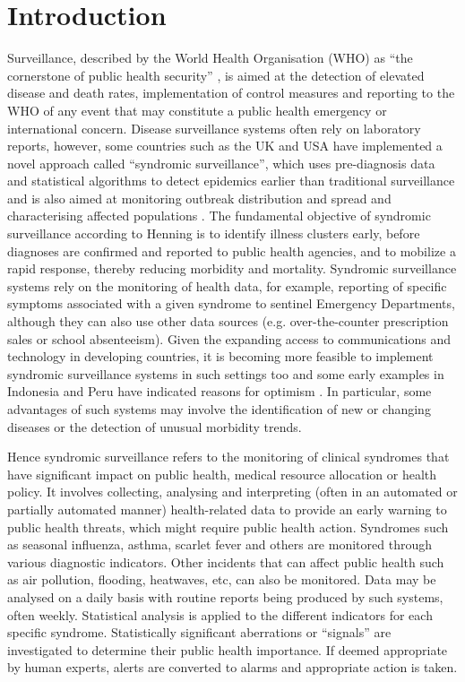 \documentclass[10pt,letterpaper]{article}
\begin{document}
\linenumbers

\section{Introduction}

Surveillance, described by the World Health Organisation (WHO) as ``the cornerstone of public health security'' \cite{REF91}, is aimed at the detection of elevated disease and death rates, implementation of control measures and reporting to the WHO of any event that may constitute a public health emergency or international concern. Disease surveillance systems often rely on laboratory reports, however, some countries such as the UK and USA have implemented a novel approach called ``syndromic surveillance'',  which uses pre-diagnosis data and statistical algorithms to detect epidemics earlier than traditional surveillance and is also aimed at monitoring outbreak distribution and spread and characterising affected populations \cite{REF90}. The fundamental objective of syndromic surveillance according to Henning  \cite{REF93} is to identify illness clusters early, before diagnoses are confirmed and reported to public health agencies, and to mobilize a rapid response, thereby reducing morbidity and mortality.  Syndromic surveillance systems rely on the monitoring of health data, for example, reporting of specific symptoms associated with a given syndrome to sentinel Emergency Departments, although they can also use other data sources (e.g. over-the-counter prescription sales or school absenteeism).  Given the expanding  access to communications and technology in developing countries, it is becoming more feasible to implement syndromic surveillance systems in such settings too and some early examples in Indonesia and Peru have indicated reasons for optimism  \cite{REF90}. In particular, some advantages of such systems may involve the identification of new or changing diseases or the detection of unusual morbidity trends.

Hence syndromic surveillance refers to the monitoring of clinical syndromes that have significant impact on public health, medical resource allocation or health policy. It involves collecting, analysing and interpreting (often in an automated or partially automated manner) health-related data to provide an early warning to public health threats, which might require public health action.  Syndromes  such as seasonal influenza, asthma, scarlet fever and others are monitored through various diagnostic indicators.  Other incidents that can affect public health such as air pollution, flooding, heatwaves, etc, can also be monitored.  Data may be analysed on a daily basis with routine reports being produced by such systems, often weekly.  Statistical analysis is applied to the different indicators for each specific syndrome.  Statistically significant aberrations or ``signals'' are investigated to determine their public health importance.  If deemed appropriate by human experts, alerts are converted to alarms and appropriate action is taken.  
\end{document}
